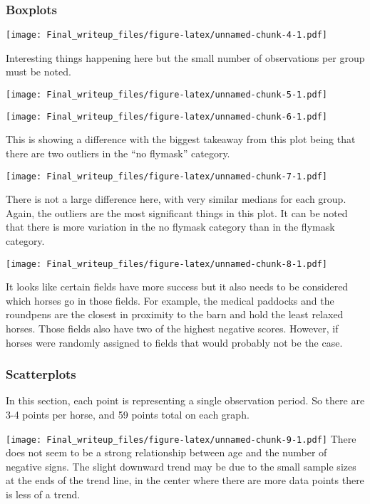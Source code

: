 \documentclass[
]{article}
\begin{document}
\hypertarget{boxplots}{%
\subsubsection{Boxplots}\label{boxplots}}

\texttt{[image: Final\_writeup\_files/figure-latex/unnamed-chunk-4-1.pdf]}

Interesting things happening here but the small number of observations
per group must be noted.

\texttt{[image: Final\_writeup\_files/figure-latex/unnamed-chunk-5-1.pdf]}

\texttt{[image: Final\_writeup\_files/figure-latex/unnamed-chunk-6-1.pdf]}

This is showing a difference with the biggest takeaway from this plot
being that there are two outliers in the ``no flymask'' category.

\texttt{[image: Final\_writeup\_files/figure-latex/unnamed-chunk-7-1.pdf]}

There is not a large difference here, with very similar medians for each
group. Again, the outliers are the most significant things in this plot.
It can be noted that there is more variation in the no flymask category
than in the flymask category.

\texttt{[image: Final\_writeup\_files/figure-latex/unnamed-chunk-8-1.pdf]}

It looks like certain fields have more success but it also needs to be
considered which horses go in those fields. For example, the medical
paddocks and the roundpens are the closest in proximity to the barn and
hold the least relaxed horses. Those fields also have two of the highest
negative scores. However, if horses were randomly assigned to fields
that would probably not be the case.

\hypertarget{scatterplots}{%
\subsubsection{Scatterplots}\label{scatterplots}}

In this section, each point is representing a single observation period.
So there are 3-4 points per horse, and 59 points total on each graph.

\texttt{[image: Final\_writeup\_files/figure-latex/unnamed-chunk-9-1.pdf]}
There does not seem to be a strong relationship between age and the
number of negative signs. The slight downward trend may be due to the
small sample sizes at the ends of the trend line, in the center where
there are more data points there is less of a trend.
\end{document}

